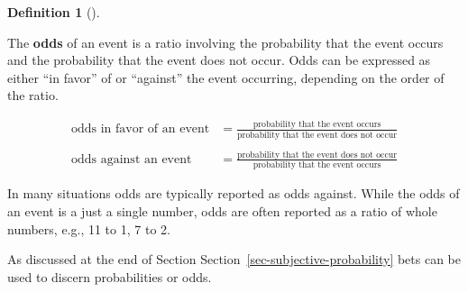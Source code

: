 \documentclass[
  letterpaper,
  DIV=11,
  numbers=noendperiod]{scrreprt}
\theoremstyle{plain}
\theoremstyle{definition}
\theoremstyle{definition}
\theoremstyle{definition}
\newtheorem{definition}{Definition}[chapter]
\theoremstyle{remark}
\begin{document}

\begin{definition}[]\protect\hypertarget{def-odds}{}\label{def-odds}

The \textbf{odds} of an event is a ratio involving the
probability that the event occurs and the probability that the event
does not occur. Odds can be expressed as either ``in favor'' of or
``against'' the event occurring, depending on the order of the ratio.

\end{definition}

\[
\begin{aligned}
\text{odds in favor of an event} & = \frac{\text{probability that the event occurs}}{\text{probability that the event does not occur}} \\
& \\
\text{odds against an event} & = \frac{\text{probability that the event does not occur}}{\text{probability that the event occurs}}\end{aligned}
\]

In many situations odds are typically reported as odds against. While
the odds of an event is a just a single number, odds are often reported
as a ratio of whole numbers, e.g., 11 to 1, 7 to 2.

As discussed at the end of Section
Section~\ref{sec-subjective-probability} bets can be used to discern
probabilities or odds.
\end{document}

